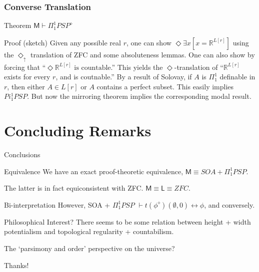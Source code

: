 \documentclass{beamer}
\begin{document}
\begin{frame}
    \frametitle{Converse Translation}
\begin{block}{Theorem}
$\mathsf{M} \vdash \Pi_1^1 PSP^\diamond$
\end{block}
\begin{block}{Proof (sketch)}
     Given any possible real $r$, one can show $\Diamond \exists x[ x = \mathbb{R}^{L[r]}]$
    using the $\Diamond_\uparrow$ translation of ZFC and some absoluteness lemmas. 
     One can also show by forcing that ``$\Diamond \mathbb{R}^{L[r]} \text{ is countable}$.''
     This yields the $\Diamond$-translation of ``$\mathbb{R}^{L[r]}$ exists for every $r$, and is coutnable.''
     By a result of Solovay, if $A$ is $\Pi^1_1$ definable in $r$, then 
    either $A \in L[r]$ or $A$ contains a perfect subset. This easily implies $Pi_1^1 PSP$.
     But now the mirroring theorem implies the corresponding modal result.
    
\end{block}
\end{frame}
\section{Concluding Remarks}
\begin{frame}{Conclusions}
    \begin{block}{Equivalence}
        We have an exact proof-theoretic equivalence, $\mathsf{M} \equiv SOA + \Pi_1^1 PSP$.

         The latter is in fact equiconsistent with ZFC. $\mathsf{M} \equiv \mathsf{L} \equiv ZFC$.
    \end{block}
    \begin{block}{Bi-interpretation}
        However, SOA + $\Pi_1^1 PSP$ $\vdash t(\phi^\diamond)(\emptyset, 0) \leftrightarrow \phi$, and conversely.
    \end{block}
    \begin{block}{Philosophical Interest?}
        There seems to be some relation between height + width potentialism 
        and topological regularity + countabilism.

         The `parsimony and order' perspective on the universe?
    \end{block}
\end{frame}

\begin{frame}
\Huge{\centerline{Thanks!}}
\end{frame}
\end{document}
